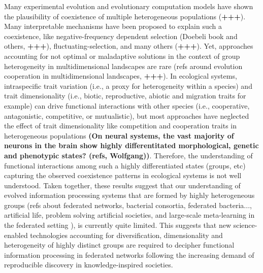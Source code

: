 \documentclass[11pt, a4paper]{article} %
\begin{document}
Many experimental evolution and evolutionary computation models have
shown the plausibility of coexistence of multiple heterogeneous
populations ({\bf +++}). Many interpretable mechanisms have been
proposed to explain such a coexistence, like negative-frequency
dependent selection (Doebeli book and others, {\bf +++}),
fluctuating-selection, and many others ({\bf +++}). Yet, approaches
accounting for not optimal or maladaptive solutions in the context of
group heterogeneity in multidimensional landscapes are rare (refs
around evolution cooperation in multidimensional landscapes, {\bf
  +++}). In ecological systems, intraspecific trait variation (i.e., a
proxy for heterogeneity within a species) and trait dimensionality
(i.e., biotic, reproductive, abiotic and migration traits for example)
can drive functional interactions with other species (i.e.,
cooperative, antagonistic, competitive, or mutualistic), but most
approaches have neglected the effect of trait dimensionality like
competition and cooperation traits in heterogeneous populations {\bf
  (On neural systems, the vast majority of neurons in the brain show
  highly differentitated morphological, genetic and phenotypic states?
  (refs, Wolfgang))}. Therefore, the understanding of functional
interactions among such a highly differentiated states (groups, etc)
capturing the observed coexistence patterns in ecological systems is
not well understood. Taken together, these results suggest that our
understanding of evolved information processing systems that are
formed by highly heterogeneous groups (refs about federated networks,
bacterial consortia, federated bacteria..., artificial life, problem
solving artificial societies, and large-scale meta-learning in the
federated setting \citep{Dilley2016}), is currently quite
limited. This suggests that new science-enabled technologies
accounting for diversification, dimensionality and heterogeneity of
highly distinct groups are required to decipher functional information
processing in federated networks following the increasing demand of
reproducible discovery in knowledge-inspired societies.
\end{document}
